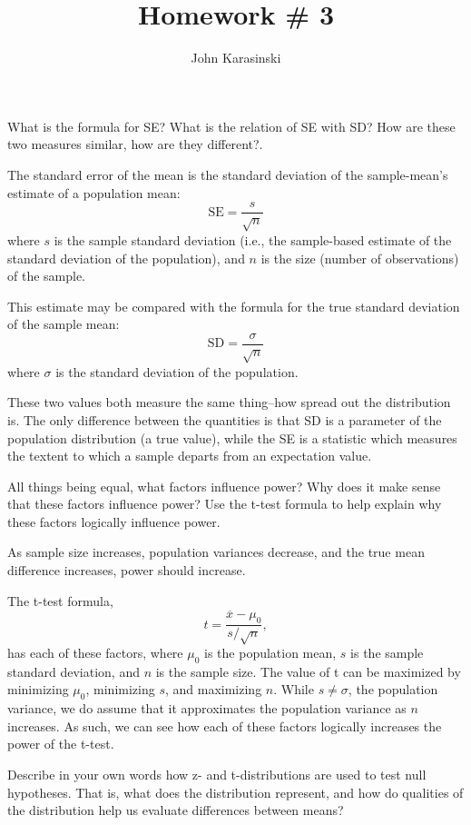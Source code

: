 \documentclass[onecolumn,10pt]{jhwhw}
\author{John Karasinski}
\title{Homework \# 3}
\begin{document}

\problem{}
What is the formula for SE? What is the relation of SE with SD?  How are these two measures similar, how are they different?.

\solution
The standard error of the mean is the standard deviation of the sample-mean's estimate of a population mean:
$$\text{SE} = \frac{s}{\sqrt{n}}$$
where $s$ is the sample standard deviation (i.e., the sample-based estimate of the standard deviation of the population), and
$n$ is the size (number of observations) of the sample.

This estimate may be compared with the formula for the true standard deviation of the sample mean:
$$\text{SD} = \frac{\sigma}{\sqrt{n}}$$
where $\sigma$ is the standard deviation of the population.

These two values both measure the same thing--how spread out the distribution is. The only difference between the quantities is that SD is a parameter of the population distribution (a true value), while the SE is a statistic which measures the textent to which a sample departs from an expectation value.

\problem{}
All things being equal, what factors influence power? Why does it make sense that these factors influence power? Use the t-test formula to help explain why these factors logically influence power.

\solution
As sample size increases, population variances decrease, and the true mean difference increases, power should increase.

The t-test formula,
$$t = \frac{\overline{x} - \mu_0}{s/\sqrt{n}},$$
has each of these factors, where $\mu_0$ is the population mean, $s$ is the sample standard deviation, and $n$ is the sample size. The value of t can be maximized by minimizing $\mu_0$, minimizing $s$, and maximizing $n$. While $s \neq  \sigma$, the population variance, we do assume that it approximates the population variance as $n$ increases. As such, we can see how each of these factors logically increases the power of the t-test.

\problem{}
Describe in your own words how z- and t-distributions are used to test null hypotheses. That is, what does the distribution represent, and how do qualities of the distribution help us evaluate differences between means?
\end{document}
